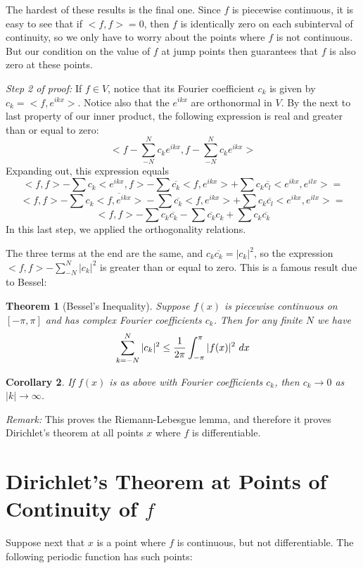 \documentclass[11pt, oneside]{amsart}
\newtheorem{theorem}{Theorem}
\newtheorem{corollary}[theorem]{Corollary}
\begin{document}
The hardest of these results is the final one. Since $f$ is piecewise continuous, it is easy to see that if $<f, f> = 0$,
then $f$ is identically zero on each subinterval of continuity, so we only have to worry about the points where $f$ is not continuous.  But our condition on the value of $f$ at jump points then guarantees that $f$ is also zero at these points.

{\em Step 2 of proof:} If $f \in V$, notice that its Fourier coefficient $c_k$ is given by $c_k = <f, e^{ikx}>$. Notice also that the $e^{ikx}$ are orthonormal in $V$. By the next to last property of our inner product, the following expression is real and greater than or equal to zero:
$$ <f - \sum_{-N}^N c_k e^{ikx}, f - \sum_{-N}^N c_k e^{ikx}>$$
Expanding out, this expression equals
$$<f, f> - \sum c_k<e^{ikx}, f> - \sum \overline{c_k} <f, e^{ikx}> + \sum c_k \overline{c_l} <e^{ikx}, e^{ilx}> = $$
$$<f, f> - \sum c_k \overline{<f, e^{ikx}>} - \sum \overline{c_k} <f, e^{ikx}> + \sum c_k \overline{c_l} <e^{ikx}, e^{ilx}> = $$
$$<f, f> - \sum c_k \overline{c_k} - \sum \overline{c_k} c_k + \sum c_k \overline{c_k}$$
In this last step, we applied the orthogonality relations.

The three terms at the end are the same, and $c_k \overline{c_k} = \left| c_k \right|^2$, so the expression
$<f, f> - \sum_{-N}^N  \left| c_k \right|^2$ is greater than or equal to zero. This is a famous result due to Bessel:

\begin{theorem}[Bessel's Inequality]
Suppose $f(x)$ is piecewise continuous on $[- \pi, \pi]$ and has complex Fourier coefficients $c_k$. Then for any finite $N$ we have
$$\sum_{k = - N}^N |c_k|^2 \le {1 \over {2 \pi}} \int_{- \pi}^\pi |f(x)|^2\ dx$$
\end{theorem}

\begin{corollary}
If $f(x)$ is as above with Fourier coefficients $c_k$, then $c_k \rightarrow 0$ as $|k| \rightarrow \infty$.
\end{corollary}

{\em Remark:} This proves the Riemann-Lebesgue lemma, and therefore it proves Dirichlet's theorem at all points $x$ where $f$ is differentiable.

\section{Dirichlet's Theorem at Points of Continuity of $f$}

Suppose next that $x$ is a point where $f$ is continuous, but not differentiable. The following periodic function has such points:
\end{document}
